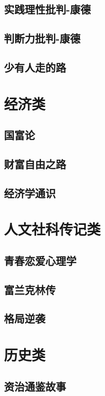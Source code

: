 \documentclass[UTF8,a4paper,12pt]{ctexbook}
\begin{document}
	\section{实践理性批判-康德}
	
	\section{判断力批判-康德}
	
	\section{少有人走的路}
\chapter{经济类}
	\section{国富论}
	
	\section{财富自由之路}

	\section{经济学通识}
	
	
\chapter{人文社科传记类}
	\section{青春恋爱心理学}		
	
	\section{富兰克林传}

	\section{格局逆袭}
	
	
\chapter{历史类}
	\section{资治通鉴故事}
	
\end{document}
